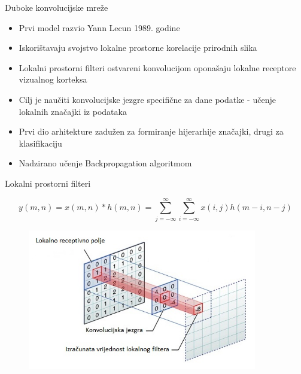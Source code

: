 \documentclass[pdf]{beamer}
\begin{document}
\begin{frame}{Duboke konvolucijske mreže}

\begin{itemize}
\setlength\itemsep{0.5em}

	\item  Prvi model razvio Yann Lecun 1989. godine 
	
	\item Iskorištavaju svojstvo lokalne prostorne korelacije prirodnih slika
	
	\item Lokalni prostorni filteri ostvareni konvolucijom oponašaju lokalne receptore vizualnog korteksa


	\item Cilj je naučiti konvolucijske jezgre specifične za dane podatke - učenje lokalnih  značajki iz podataka

	\item Prvi dio arhitekture zadužen za formiranje hijerarhije značajki, drugi za klasifikaciju
	
	\item Nadzirano učenje Backpropagation algoritmom 
	
\end{itemize} 
 
\end{frame}

\begin{frame}{Lokalni prostorni filteri}

\begin{equation}
		y(m,n) = x(m,n)  \ast h(m,n) = \sum\limits_{j=-\infty}^{\infty} \sum\limits_{i=-\infty}^{\infty} x(i,j) h(m-i,n-j)  \nonumber
\end{equation}

\begin{figure}
\centering
\includegraphics[width=10cm]{slike/kernel_convolution.jpg}
\end{figure}
	
\end{frame}
\end{document}
